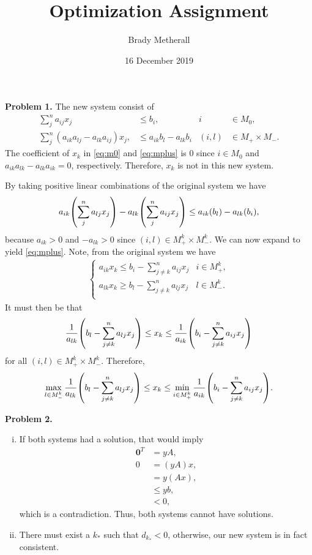 \documentclass[11pt,a4paper]{article}
\title{Optimization Assignment}
\author{Brady Metherall}
\date{16 December 2019}
\let\originalleft\left
\let\originalright\right
\renewcommand{\left}{\mathopen{}\mathclose\bgroup\originalleft}
\renewcommand{\right}{\aftergroup\egroup\originalright}
\begin{document}
\maketitle


\textbf{Problem 1.}
The new system consist of
\begin{align}
    \sum_j^n a_{ij} x_j &\leq b_i, & i &\in M_0, \label{eq:m0} \\
    \sum_j^n (a_{ik} a_{lj} - a_{lk} a_{ij}) x_j, &\leq a_{ik} b_l - a_{lk} b_i & (i,l) &\in M_+ \times M_-. \label{eq:mplus}
\end{align}
The coefficient of $x_k$ in \eqref{eq:m0} and \eqref{eq:mplus} is 0 since $i \in M_0$ and $a_{ik} a_{lk} - a_{lk} a_{ik} = 0$, respectively. Therefore, $x_k$ is not in this new system.

By taking positive linear combinations of the original system we have
\begin{align*}
    a_{ik} \left( \sum_j^n a_{lj} x_j \right) - a_{lk} \left( \sum_j^n a_{ij} x_j \right) \leq a_{ik} \left( b_l \right) - a_{lk} \left( b_i \right),
\end{align*}
because $a_{ik} > 0$ and $-a_{lk} > 0$ since $(i, l) \in M_+^k \times M_-^k$. We can now expand to yield \eqref{eq:mplus}. Note, from the original system we have
\begin{align*}
    \begin{cases}
        \displaystyle a_{ik} x_k \leq b_i - \sum_{j \neq k}^n a_{ij} x_j & i \in M_+^k, \\
        \displaystyle a_{lk} x_k \geq b_l - \sum_{j \neq k}^n a_{lj} x_j & l \in M_-^k. \\
    \end{cases}
\end{align*}
It must then be that
\begin{align*}
    \frac{1}{a_{lk}} \left( b_l - \sum_{j \neq k}^n a_{lj} x_j \right) \leq x_k \leq \frac{1}{a_{ik}} \left( b_i - \sum_{j \neq k}^n a_{ij} x_j \right)
\end{align*}
for all $(i, l) \in M_+^k \times M_-^k$. Therefore,
\begin{align*}
    \max_{l \in M_-^k} \frac{1}{a_{lk}} \left( b_l - \sum_{j \neq k}^n a_{lj} x_j \right) \leq x_k \leq \min_{i \in M_+^k} \frac{1}{a_{ik}} \left( b_i - \sum_{j \neq k}^n a_{ij} x_j \right).
\end{align*}

\textbf{Problem 2.}
\begin{enumerate}[i)]
    \item
    If both systems had a solution, that would imply
    \begin{align*}
        \mathbf{0}^T &= yA, \\
        0 &= (y A) x, \\
        &= y (A x), \\
        &\leq yb, \\
        &< 0,
    \end{align*}
    which is a contradiction. Thus, both systems cannot have solutions.
    \item
    There must exist a $k_*$ such that $d_{k_*} < 0$, otherwise, our new system is in fact consistent.
\end{enumerate}
\end{document}
